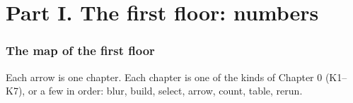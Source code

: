 
\part*{Part I. The first floor: numbers}
\section*{The map of the first floor}
\begin{center}
{\small Each arrow is one chapter. Each chapter is one of the kinds of Chapter 0 (K1--K7), or a few in order: blur, build, select, arrow, count, table, rerun.}
\end{center}

